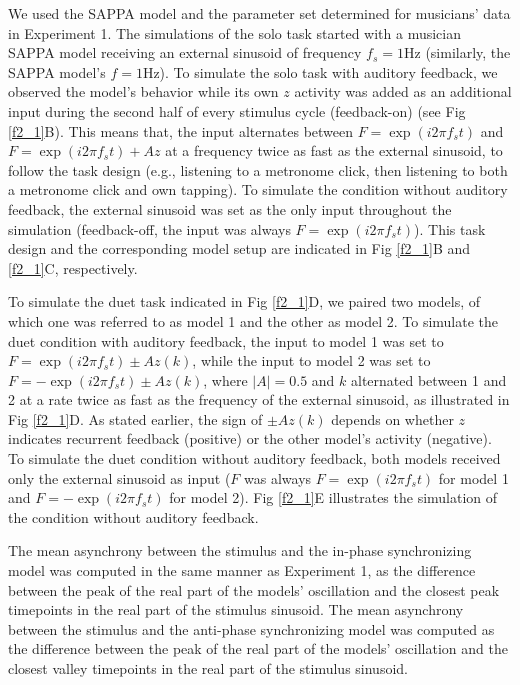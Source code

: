 \documentclass{report}
\begin{document}
We used the SAPPA model and the parameter set determined for musicians' data in Experiment 1. The simulations of the solo task started with a musician SAPPA model receiving an external sinusoid of frequency $f_s = 1$Hz (similarly, the SAPPA model's $f = 1$Hz). To simulate the solo task with auditory feedback, we observed the model's behavior while its own $z$ activity was added as an additional input during the second half of every stimulus cycle (feedback-on) (see Fig \ref{f2_1}B). This means that, the input alternates between $F = \exp(i2\pi f_s t)$ and $F = \exp(i2\pi f_s t) + Az$ at a frequency twice as fast as the external sinusoid, to follow the task design (e.g., listening to a metronome click, then listening to both a metronome click and own tapping). To simulate the condition without auditory feedback, the external sinusoid was set as the only input throughout the simulation (feedback-off, the input was always $F = \exp(i2\pi f_s t)$). This task design and the corresponding model setup are indicated in Fig \ref{f2_1}B and \ref{f2_1}C, respectively.

To simulate the duet task indicated in Fig \ref{f2_1}D, we paired two models, of which one was referred to as model 1 and the other as model 2. To simulate the duet condition with auditory feedback, the input to model 1 was set to $F = \exp(i2\pi f_s t) \pm Az(k)$, while the input to model 2 was set to $F = -\exp(i2\pi f_s t) \pm Az(k)$, where $|A| = 0.5$ and $k$ alternated between 1 and 2 at a rate twice as fast as the frequency of the external sinusoid, as illustrated in Fig \ref{f2_1}D. As stated earlier, the sign of $\pm Az(k)$ depends on whether $z$ indicates recurrent feedback (positive) or the other model’s activity (negative). To simulate the duet condition without auditory feedback, both models received only the external sinusoid as input ($F$ was always $F = \exp(i2\pi f_s t)$ for model 1 and $F = -\exp(i2\pi f_s t)$ for model 2). Fig \ref{f2_1}E illustrates the simulation of the condition without auditory feedback.

The mean asynchrony between the stimulus and the in-phase synchronizing model was computed in the same manner as Experiment 1, as the difference between the peak of the real part of the models' oscillation and the closest peak timepoints in the real part of the stimulus sinusoid. The mean asynchrony between the stimulus and the anti-phase synchronizing model was computed as the difference between the peak of the real part of the models' oscillation and the closest valley timepoints in the real part of the stimulus sinusoid.
\end{document}
